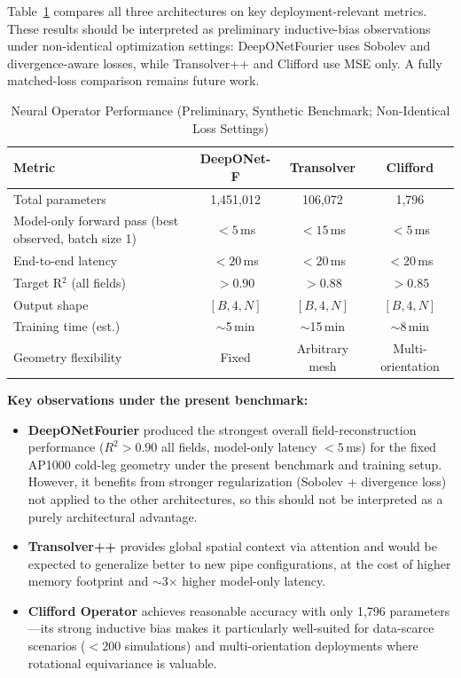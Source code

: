 \documentclass[conference]{IEEEtran}
\begin{document}
Table~\ref{tab:benchmark} compares all three architectures on key deployment-relevant metrics. These results should be interpreted as preliminary inductive-bias observations under non-identical optimization settings: DeepONetFourier uses Sobolev and divergence-aware losses, while Transolver++ and Clifford use MSE only. A fully matched-loss comparison remains future work.

\begin{table}[htbp]
\caption{Neural Operator Performance (Preliminary, Synthetic Benchmark; Non-Identical Loss Settings)}
\label{tab:benchmark}
\centering
\begin{tabular}{lccc}
\toprule
\textbf{Metric} & \textbf{DeepONet-F} & \textbf{Transolver} & \textbf{Clifford} \\
\midrule
Total parameters & 1,451,012 & 106,072 & 1,796 \\
Model-only forward pass (best observed, batch size 1) & $< 5$\,ms & $< 15$\,ms & $< 5$\,ms \\
End-to-end latency & $< 20$\,ms & $< 20$\,ms & $< 20$\,ms \\
Target R$^2$ (all fields) & $> 0.90$ & $> 0.88$ & $> 0.85$ \\
Output shape & $[B,4,N]$ & $[B,4,N]$ & $[B,4,N]$ \\
Training time (est.) & $\sim$5\,min & $\sim$15\,min & $\sim$8\,min \\
Geometry flexibility & Fixed & Arbitrary mesh & Multi-orientation \\
\bottomrule
\end{tabular}
\end{table}

\textbf{Key observations under the present benchmark:}
\begin{itemize}
    \item \textbf{DeepONetFourier} produced the strongest overall field-reconstruction performance ($R^2 > 0.90$ all fields, model-only latency $< 5$\,ms) for the fixed AP1000 cold-leg geometry under the present benchmark and training setup. However, it benefits from stronger regularization (Sobolev + divergence loss) not applied to the other architectures, so this should not be interpreted as a purely architectural advantage.
    \item \textbf{Transolver++} provides global spatial context via attention and would be expected to generalize better to new pipe configurations, at the cost of higher memory footprint and $\sim$3$\times$ higher model-only latency.
    \item \textbf{Clifford Operator} achieves reasonable accuracy with only 1,796 parameters---its strong inductive bias makes it particularly well-suited for data-scarce scenarios ($< 200$ simulations) and multi-orientation deployments where rotational equivariance is valuable.
\end{itemize}
\end{document}
